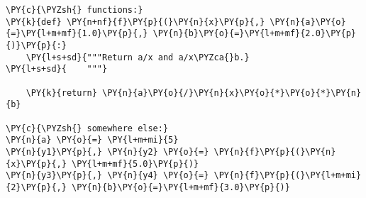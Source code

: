 \begin{Verbatim}[commandchars=\\\{\}]
\PY{c}{\PYZsh{} functions:}
\PY{k}{def} \PY{n+nf}{f}\PY{p}{(}\PY{n}{x}\PY{p}{,} \PY{n}{a}\PY{o}{=}\PY{l+m+mf}{1.0}\PY{p}{,} \PY{n}{b}\PY{o}{=}\PY{l+m+mf}{2.0}\PY{p}{)}\PY{p}{:}
    \PY{l+s+sd}{"""Return a/x and a/x\PYZca{}b.}
\PY{l+s+sd}{    """}

    \PY{k}{return} \PY{n}{a}\PY{o}{/}\PY{n}{x}\PY{o}{*}\PY{o}{*}\PY{n}{b}

\PY{c}{\PYZsh{} somewhere else:}
\PY{n}{a} \PY{o}{=} \PY{l+m+mi}{5}
\PY{n}{y1}\PY{p}{,} \PY{n}{y2} \PY{o}{=} \PY{n}{f}\PY{p}{(}\PY{n}{x}\PY{p}{,} \PY{l+m+mf}{5.0}\PY{p}{)}
\PY{n}{y3}\PY{p}{,} \PY{n}{y4} \PY{o}{=} \PY{n}{f}\PY{p}{(}\PY{l+m+mi}{2}\PY{p}{,} \PY{n}{b}\PY{o}{=}\PY{l+m+mf}{3.0}\PY{p}{)}
\end{Verbatim}
